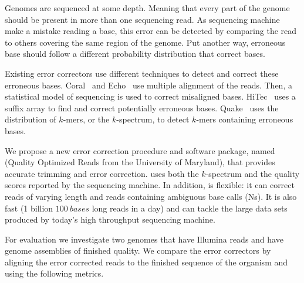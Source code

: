 \documentclass[10pt]{bmc_article}
\newenvironment{bmcformat}{\fussy\setboolean{publ}{true}}{\fussy}
\begin{document}
\begin{bmcformat}
Genomes are sequenced at some depth.
Meaning that every part of the genome should be present in more than one sequencing read.
As sequencing machine make a mistake reading a base, this error can be detected by comparing the read to others covering the same region of the genome.
Put another way, erroneous base should follow a different probability distribution that correct bases.

Existing error correctors use different techniques to detect and correct these erroneous bases.
Coral~\cite{salmela2011correcting} and Echo~\cite{Kao2011} use multiple alignment of the reads.
Then, a statistical model of sequencing is used to correct misaligned bases.
HiTec~\cite{Ilie2011b} uses a suffix array to find and correct potentially erroneous bases.
Quake~\cite{Kelley:2010fk} uses the distribution of $k$-mers, or the $k$-spectrum, to detect $k$-mers containing erroneous bases.

We propose a new error correction procedure and software package, named \quorum (Quality Optimized Reads from the University of Maryland), that provides accurate trimming and error correction.
\quorum uses both the $k$-spectrum and the quality scores reported by the sequencing machine.
In addition, \quorum is flexible: it can correct reads of varying length and reads containing ambiguous base calls (Ns).
It is also fast (1 billion $\SI{100}{bases}$ long reads in a day) and can tackle the large data sets produced by today's high throughput sequencing machine.

For evaluation we investigate two genomes that have Illumina reads and have genome assemblies of finished quality.
We compare the error correctors by aligning the error corrected reads to the finished sequence of the organism and using the following metrics.


\end{bmcformat}
\end{document}
